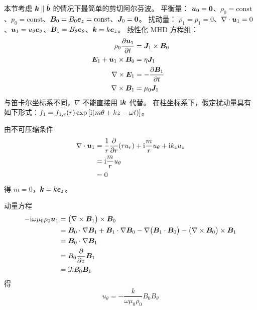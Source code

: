 本节考虑 $\bm{k}\parallel\hat{\bm{b}}$ 的情况下最简单的剪切阿尔芬波。
平衡量：
$\bm{u}_0 = \bm{0}$、$\rho_0 = \text{const}$、$p_0 = \text{const}$、$\bm{B}_0 = B_0 \bm{e}_z = \text{const}$、$\bm{J}_0 = \bm{0} $。
扰动量：
$\rho_1 = p_1 = 0$、$\nabla \cdot {\bm{u}_1} = 0$、$\bm{u}_1 = u_\theta \bm{e}_\theta$、$\bm{B}_1 = B_\theta \bm{e}_\theta$、$\bm{k} = k \bm{e}_z $。
线性化 MHD 方程组：
\begin{subequations}\begin{align}
\rho_0 \frac{\partial {\bm{u}_1}}{\partial {t}} &= \bm{J}_1 \times \bm{B}_0 \\
\bm{E}_1 + \bm{u}_1 \times \bm{B}_0 &= \eta \bm{J}_1 \\
\nabla \times {\bm{E}_1} &= - \frac{\partial {\bm{B}_1}}{\partial {t}} \\
\nabla \times {\bm{B}_1} &= \mu_0 \bm{J}_1
\end{align}\end{subequations}
与笛卡尔坐标系不同，$\nabla$ 不能直接用 $\mathrm{i}\bm{k}$ 代替。
在柱坐标系下，假定扰动量具有如下形式：$f_1 = f_{1,r}(r) \exp{[\mathrm{i}(m \theta + k z - \omega t)]}$。

由不可压缩条件
\begin{equation}\begin{aligned}
\nabla \cdot {\bm{u}_1} &= \frac{1}{r} \frac{\partial {}}{\partial {r}}(r u_r) + \mathrm{i} \frac{m}{r} u_\theta + \mathrm{i} k_z u_z \\
&= \mathrm{i} \frac{m}{r} u_\theta \\
&= 0
\end{aligned}\end{equation}
得 $m = 0$，$\bm{k} = k \bm{e}_z$。

动量方程
\begin{equation}\begin{aligned}
- \mathrm{i} \omega \mu_0 \rho_0 \bm{u}_1 &=
\big( \nabla \times {\bm{B}_1} \big) \times \bm{B}_0 \\
&= \bm{B}_0 \cdot \nabla {\bm{B}_1}
+ \bm{B}_1 \cdot \nabla {\bm{B}_0}
- \nabla {\big(\bm{B}_1 \cdot \bm{B}_0\big)}
- \big( \nabla \times {\bm{B}_0} \big) \times \bm{B}_1 \\
&= \bm{B}_0 \cdot \nabla {\bm{B}_1} \\
&= B_0 \frac{\partial {}}{\partial {z}} \bm{B}_1 \\
&= \mathrm{i} k B_0 \bm{B}_1
\end{aligned}\end{equation}
得
\begin{equation}
u_\theta = - \frac{k}{\omega \mu_0 \rho_0} B_0 B_\theta
\end{equation}

